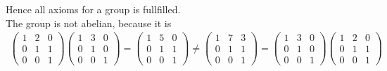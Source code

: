 \documentclass[solution]{tudexercise}
\begin{document}
				Hence all axioms for a group is fullfilled.\\
				The group is not abelian, because it is
				\begin{align*}
\begin{pmatrix}
1 & 2 & 0\\
0 & 1 & 1\\
0 & 0 & 1
\end{pmatrix}\begin{pmatrix}
1 & 3 & 0\\
0 & 1 & 0\\
0 & 0 & 1
\end{pmatrix} = \begin{pmatrix}
1 & 5 & 0\\
0 & 1 & 1\\
0 & 0 & 1
\end{pmatrix} \neq \begin{pmatrix}
1 & 7 & 3\\
0 & 1 & 1\\
0 & 0 & 1
\end{pmatrix} = \begin{pmatrix}
1 & 3 & 0\\
0 & 1 & 0\\
0 & 0 & 1
\end{pmatrix}\begin{pmatrix}
1 & 2 & 0\\
0 & 1 & 1\\
0 & 0 & 1
\end{pmatrix}
				\end{align*}
			
\end{document}
